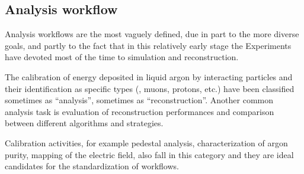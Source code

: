 \subsection{Analysis workflow}
\label{ssec:Workflows:Analysis}

Analysis workflows are the most vaguely defined,
due in part to the more diverse goals,
and partly to the fact that in this relatively early stage the Experiments
have devoted most of the time to simulation and reconstruction.

The calibration of energy deposited in liquid argon by interacting particles
and their identification as specific types (\eg, muons, protons, etc.)
have been classified sometimes as ``analysis'', sometimes as ``reconstruction''.
Another common analysis task is evaluation of reconstruction performances
and comparison between different algorithms and strategies.

Calibration activities, for example pedestal analysis,
characterization of argon purity, mapping of the electric field,
also fall in this category and they are ideal candidates for the standardization of workflows.
